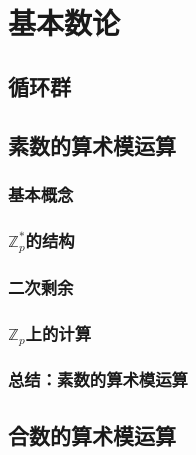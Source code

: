 \chapter{基本数论}\label{chap:A}

\section{循环群}\label{sec:A-1}

\section{素数的算术模运算}\label{sec:A-2}

\subsection{基本概念}\label{subsec:A-2-1}

\subsection{$\mathbb{Z}_p^*$的结构}\label{subsec:A-2-2}

\subsection{二次剩余}\label{subsec:A-2-3}

\subsection{$\mathbb{Z}_p$上的计算}\label{subsec:A-2-4}

\subsection{总结：素数的算术模运算}\label{subsec:A-2-5}

\section{合数的算术模运算}

\begin{theorem}[中国剩余定理]\label{theo:A-1}
	
\end{theorem}